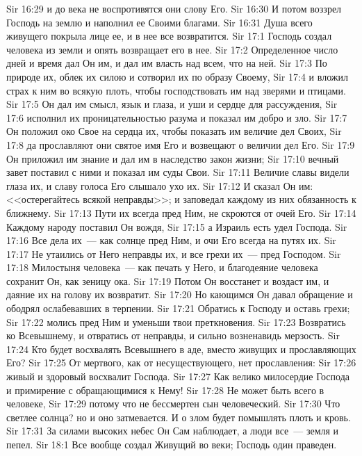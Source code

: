 \vs Sir 16:29 и до века не воспротивятся они слову Его.
\vs Sir 16:30 И потом воззрел Господь на землю и наполнил ее Своими благами.
\vs Sir 16:31 Душа всего живущего покрыла лице ее, и в нее все возвратится.
\vs Sir 17:1 Господь создал человека из земли и опять возвращает его в нее.
\vs Sir 17:2 Определенное число дней и время дал Он им, и дал им власть над всем, что на ней.
\vs Sir 17:3 По природе их, облек их силою и сотворил их по образу Своему,
\vs Sir 17:4 и вложил страх к ним во всякую плоть, чтобы господствовать им над зверями и птицами.
\vs Sir 17:5 Он дал им смысл, язык и глаза, и уши и сердце для рассуждения,
\vs Sir 17:6 исполнил их проницательностью разума и показал им добро и зло.
\vs Sir 17:7 Он положил око Свое на сердца их, чтобы показать им величие дел Своих,
\vs Sir 17:8 да прославляют они святое имя Его и возвещают о величии дел Его.
\vs Sir 17:9 Он приложил им знание и дал им в наследство закон жизни;
\vs Sir 17:10 вечный завет поставил с ними и показал им суды Свои.
\vs Sir 17:11 Величие славы видели глаза их, и славу голоса Его слышало ухо их.
\vs Sir 17:12 И сказал Он им: <<остерегайтесь всякой неправды>>; и заповедал каждому из них обязанность к ближнему.
\vs Sir 17:13 Пути их всегда пред Ним, не скроются от очей Его.
\vs Sir 17:14 Каждому народу поставил Он вождя,
\vs Sir 17:15 а Израиль есть удел Господа.
\vs Sir 17:16 Все дела их~--- как солнце пред Ним, и очи Его всегда на путях их.
\vs Sir 17:17 Не утаились от Него неправды их, и все грехи их~--- пред Господом.
\rsbpar\vs Sir 17:18 Милостыня человека~--- как печать у Него, и благодеяние человека сохранит Он, как зеницу ока.
\vs Sir 17:19 Потом Он восстанет и воздаст им, и даяние их на голову их возвратит.
\vs Sir 17:20 Но кающимся Он давал обращение и ободрял ослабевавших в терпении.
\vs Sir 17:21 Обратись к Господу и оставь грехи;
\vs Sir 17:22 молись пред Ним и уменьши твои преткновения.
\vs Sir 17:23 Возвратись ко Всевышнему, и отвратись от неправды, и сильно возненавидь мерзость.
\vs Sir 17:24 Кто будет восхвалять Всевышнего в аде, вместо живущих и прославляющих Его?
\vs Sir 17:25 От мертвого, как от несуществующего, нет прославления:
\vs Sir 17:26 живый и здоровый восхвалит Господа.
\vs Sir 17:27 Как велико милосердие Господа и примирение с обращающимися к Нему!
\vs Sir 17:28 Не может быть всего в человеке,
\vs Sir 17:29 потому что не бессмертен сын человеческий.
\vs Sir 17:30 Что светлее солнца? но и оно затмевается. И о злом будет помышлять плоть и кровь.
\vs Sir 17:31 За силами высоких небес Он Сам наблюдает, а люди все~--- земля и пепел.
\vs Sir 18:1 Все вообще создал Живущий во веки; Господь один праведен.
